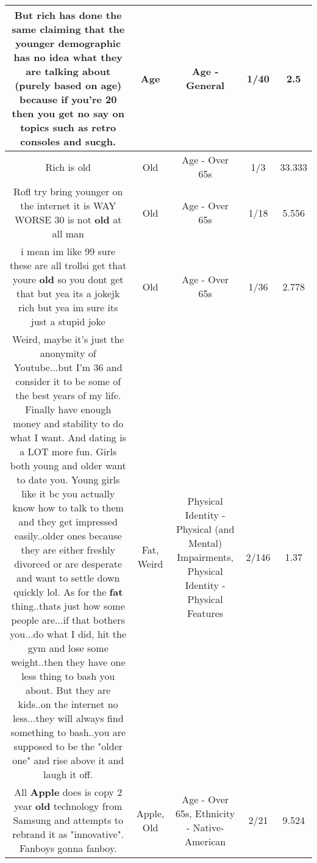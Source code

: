 \documentclass[11pt]{article}
\newlength\mylength
\begin{document}
\begin{center}
\begin{longtable}{|C{.65\mylength}|C{.30\mylength}|C{.12\mylength}|C{.12\mylength}|C{.12\mylength}|}
  \small But rich has done the same claiming that the younger demographic has no idea what they are talking about (purely based on \textbf{age}) because if you're 20 then you get no say on topics such as retro consoles and sucgh.\normalsize   & Age & Age - General & 1/40 & 2.5 \\  \hline
  \small Rich is old\normalsize   & Old & Age - Over 65s & 1/3 & 33.333 \\  \hline
  \small Rofl try bring younger on the internet it is WAY WORSE 30 is not \textbf{old} at all man\normalsize   & Old & Age - Over 65s & 1/18 & 5.556 \\  \hline
  \small i mean im like 99 sure these are all trollsi get that youre \textbf{old} so you dont get that but yea its a jokejk rich but yea im sure its just a stupid joke\normalsize   & Old & Age - Over 65s & 1/36 & 2.778 \\  \hline
  \small Weird, maybe it's just the anonymity of Youtube...but I'm 36 and consider it to be some of the best years of my life. Finally have enough money and stability to do what I want. And dating is a LOT more fun. Girls both young and older want to date you. Young girls like it bc you actually know how to talk to them and they get impressed easily..older ones because they are either freshly divorced or are desperate and want to settle down quickly lol. As for the \textbf{fat} thing..thats just how some people are...if that bothers you...do what I did, hit the gym and lose some weight..then they have one less thing to bash you about. But they are kids..on the internet no less...they will always find something to bash..you are supposed to be the "older one" and rise above it and laugh it off.\normalsize   & Fat, Weird & Physical Identity - Physical (and Mental) Impairments, Physical Identity - Physical Features & 2/146 & 1.37 \\  \hline
  \small All \textbf{Apple} does is copy 2 year \textbf{old} technology from Samsung and attempts to rebrand it as "innovative". Fanboys gonna fanboy.\normalsize   & Apple, Old & Age - Over 65s, Ethnicity - Native-American & 2/21 & 9.524 \\  \hline

\end{longtable}
\end{center}
\end{document}
